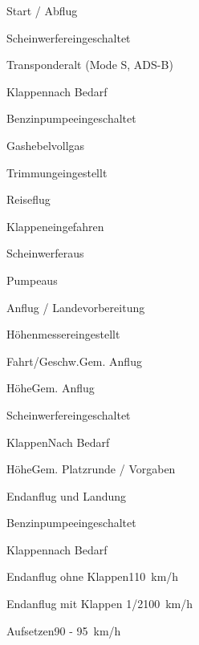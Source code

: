 \begin{checklist}{Start / Abflug}
	  \item{Scheinwerfer}{eingeschaltet}
	  \item{Transponder}{alt (Mode S, ADS-B)}
	  \item{Klappen}{nach Bedarf}
	  \item{Benzinpumpe}{eingeschaltet}
	  \item{Gashebel}{vollgas}
	\item{Trimmung}{eingestellt}
\end{checklist}
	
\begin{checklist}{Reiseflug}
	\item{Klappen}{eingefahren}
	\item{Scheinwerfer}{aus}
	\item{Pumpe}{aus} 
	 
\end{checklist}

\begin{checklist}{Anflug / Landevorbereitung}
	\item{Höhenmesser}{eingestellt}
	\item{Fahrt/Geschw.}{Gem. Anflug}
	\item{Höhe}{Gem. Anflug}
	\item{Scheinwerfer}{eingeschaltet}
	\item{Klappen}{Nach Bedarf}
	\item{Höhe}{Gem. Platzrunde / Vorgaben}
\end{checklist}

\begin{checklist}{Endanflug und Landung}
	\item{Benzinpumpe}{eingeschaltet}
	\item{Klappen}{nach Bedarf}
	\item{Endanflug ohne Klappen}{110~km/h}
	\item{Endanflug mit Klappen 1/2}{100~km/h}
	\item{Aufsetzen}{90 - 95~km/h}
\end{checklist}

